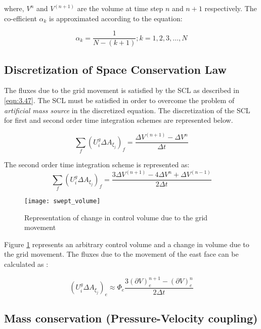 where, $V^n$ and $V^{\left(n+1\right)}$ are the volume at time step $n$ and $n+1$ respectively. The co-efficient $\alpha_k$ is approximated according to the equation:

\begin{equation}
\alpha_k = \frac{1}{N-(k+1)}; k=1,2,3,\ldots,N
\label{eqn:3.70}
\end{equation}

\subsection{Discretization of Space Conservation Law}
The fluxes due to the grid movement is satisfied by the SCL as described in \ref{eqn:3.47}. The SCL must be satisfied in order to overcome the problem of \textit{artificial mass source} in the discretized equation. The discretization of the SCL for first and second order time integration schemes are represented below.

\begin{equation}
\sum_f \left(U_i^g \Delta A_{\xi_j} \right)_f = \frac{\Delta V^{\left(n+1\right)}- \Delta V^n}{\Delta t}
\label{eqn:3.71}
\end{equation}

The second order time integration scheme is represented as:
\begin{equation}
\sum_f \left(U_i^g \Delta A_{\xi_j} \right)_f = \frac{3 \Delta V^{\left(n+1\right)}- 4 \Delta V^n + \Delta V^{\left(n-1\right)}}{2 \Delta t}
\label{eqn:3.72}
\end{equation}

\begin{figure}[h]
\centering
\texttt{[image: swept\_volume]}
\caption{Representation of change in control volume due to the grid movement}
\label{fig:3.3}
\end{figure}

Figure \ref{fig:3.3} represents an arbitrary control volume and a change in volume due to the grid movement. The fluxes due to the movement of the east face can be calculated as :

\begin{equation}
\left(U_i^g \Delta A_{\xi_j} \right)_e \approx \Phi_e \frac{3\left(\partial V\right)_e^{n+1}-\left(\partial V \right)_e^{n}}{2 \Delta t}
\end{equation}

\subsection{Mass conservation (Pressure-Velocity coupling)}

